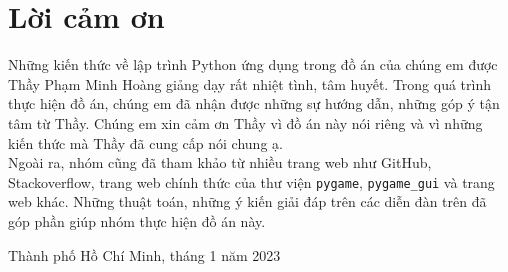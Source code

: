 \section*{Lời cảm ơn}
Những kiến thức về lập trình Python ứng dụng trong đồ án của chúng em được Thầy Phạm Minh Hoàng giảng dạy rất nhiệt tình, tâm huyết. Trong quá trình thực hiện đồ án, chúng em đã nhận được những sự hướng dẫn, những góp ý tận tâm từ Thầy. Chúng em xin cảm ơn Thầy vì đồ án này nói riêng và vì những kiến thức mà Thầy đã cung cấp nói chung ạ.\\
Ngoài ra, nhóm cũng đã tham khảo từ nhiều trang web như GitHub, Stackoverflow, trang web chính thức của thư viện \verb|pygame|, \verb|pygame_gui| và trang web khác. Những thuật toán, những ý kiến giải đáp trên các diễn đàn trên đã góp phần giúp nhóm thực hiện đồ án này. 
\begin{flushright}
Thành phố Hồ Chí Minh, tháng 1 năm 2023
\end{flushright}